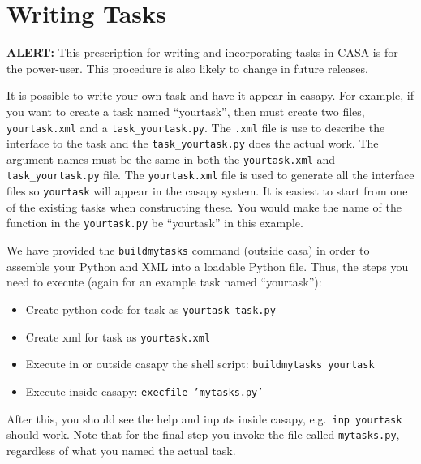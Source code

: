 

\chapter[Appendix: Writing Tasks in CASA]{Writing Tasks}
\label{chapter:write}

{\bf ALERT:} This prescription for writing and incorporating
tasks in CASA is for the power-user.  This procedure is also likely
to change in future releases.

It is possible to write your own task and have it appear in
casapy. For example, if you want to create a task named ``yourtask'',
then must create two files, {\tt yourtask.xml} and a
{\tt task\_yourtask.py}. The {\tt .xml} file is use to describe the interface to
the task and the {\tt task\_yourtask.py} does the actual work.  The argument
names must be the same in both the {\tt yourtask.xml} and {\tt task\_yourtask.py}
file. The {\tt yourtask.xml} file is used to generate all the interface
files so {\tt yourtask} will appear in the casapy system.  It is
easiest to start from one of the existing tasks when constructing
these.  You would make the name of the function in the 
{\tt  yourtask.py} be ``yourtask'' in this example.

We have provided the {\tt buildmytasks} command (outside casa) in order
to assemble your Python and XML into a loadable Python file.  Thus,
the steps you need to execute (again for an example task named ``yourtask''):
\begin{itemize}
\item Create python code for task as {\tt yourtask\_task.py}
\item Create xml for task as {\tt yourtask.xml}
\item Execute in or outside casapy the shell script: {\tt buildmytasks yourtask}
\item Execute inside casapy: {\tt execfile 'mytasks.py'}
\end{itemize}
After this, you should see the help and inputs inside casapy, e.g.\ 
{\tt inp yourtask} should work.  Note that for the final step you
invoke the file called {\tt mytasks.py}, regardless of what you named
the actual task.

